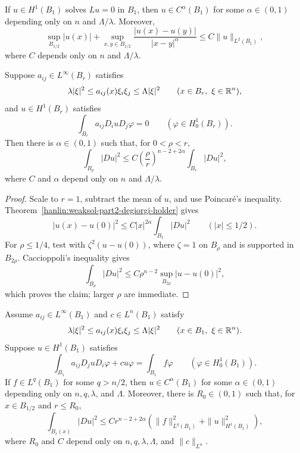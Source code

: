 \begin{theorem}\label{hanlin:weaksol-part2-degiorgi-holder}
If $u\in H^1(B_1)$ solves $Lu=0$ in $B_1$, then
$u\in C^\alpha(B_1)$ for some $\alpha\in(0,1)$ depending only on $n$ and
$\Lambda/\lambda$. Moreover,
\[
\sup_{B_{1/2}}|u(x)|+
\sup_{x,y\in B_{1/2}}\frac{|u(x)-u(y)|}{|x-y|^\alpha}
\leq C\|u\|_{L^2(B_1)},
\]
where $C$ depends only on $n$ and $\Lambda/\lambda$.
\end{theorem}

\begin{lemma}\label{hanlin:weaksol-part2-energy-decay}
Suppose $a_{ij}\in L^\infty(B_r)$ satisfies
\[
\lambda|\xi|^2\leq a_{ij}(x)\xi_i\xi_j\leq\Lambda|\xi|^2
\qquad(x\in B_r,\ \xi\in\mathbb{R}^n),
\]
and $u\in H^1(B_r)$ satisfies
\[
\int_{B_r}a_{ij}D_i uD_j\varphi=0
\qquad(\varphi\in H^1_0(B_r)).
\]
Then there is $\alpha\in(0,1)$ such that, for $0<\rho<r$,
\[
\int_{B_\rho}|Du|^2
\leq C\left(\frac\rho r\right)^{n-2+2\alpha}
\int_{B_r}|Du|^2,
\]
where $C$ and $\alpha$ depend only on $n$ and $\Lambda/\lambda$.
\end{lemma}
\begin{proof}
\sketch Scale to $r=1$, subtract the mean of $u$, and use Poincar\'e's
inequality. Theorem~\ref{hanlin:weaksol-part2-degiorgi-holder} gives
\[
|u(x)-u(0)|^2\leq C|x|^{2\alpha}\int_{B_1}|Du|^2
\qquad(|x|\leq1/2).
\]
For $\rho\leq1/4$, test with
$\zeta^2(u-u(0))$, where $\zeta=1$ on $B_\rho$ and is supported in
$B_{2\rho}$. Caccioppoli's inequality gives
\[
\int_{B_\rho}|Du|^2
\leq C\rho^{n-2}\sup_{B_{2\rho}}|u-u(0)|^2,
\]
which proves the claim; larger $\rho$ are immediate.
\end{proof}

\begin{theorem}\label{hanlin:weaksol-part2-general-linear-holder}
Assume $a_{ij}\in L^\infty(B_1)$ and $c\in L^n(B_1)$ satisfy
\[
\lambda|\xi|^2\leq a_{ij}(x)\xi_i\xi_j\leq\Lambda|\xi|^2
\qquad(x\in B_1,\ \xi\in\mathbb{R}^n).
\]
Suppose $u\in H^1(B_1)$ satisfies
\[
\int_{B_1}a_{ij}D_j uD_i\varphi+cu\varphi
=\int_{B_1}f\varphi
\qquad(\varphi\in H^1_0(B_1)).
\]
If $f\in L^q(B_1)$ for some $q>n/2$, then
$u\in C^\alpha(B_1)$ for some $\alpha\in(0,1)$ depending only on
$n,q,\lambda$, and $\Lambda$. Moreover, there is $R_0\in(0,1)$ such
that, for $x\in B_{1/2}$ and $r\leq R_0$,
\[
\int_{B_r(x)}|Du|^2
\leq Cr^{n-2+2\alpha}
\left(\|f\|_{L^q(B_1)}^2+\|u\|_{H^1(B_1)}^2\right),
\]
where $R_0$ and $C$ depend only on
$n,q,\lambda,\Lambda$, and $\|c\|_{L^n}$.
\end{theorem}

